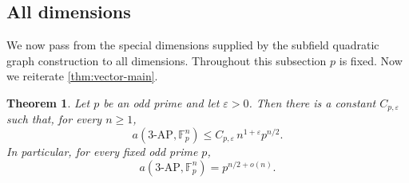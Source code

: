 \documentclass[11pt]{article}
\newtheorem{theorem}{Theorem}[section]
\begin{document}
	\subsection{All dimensions}\label{subsec:all-dimensions}
	
	We now pass from the special dimensions supplied by the subfield quadratic graph
	construction to all dimensions.   Throughout this subsection \(p\) is fixed. Now we reiterate  \cref{thm:vector-main}.
	
	\begin{theorem}
		Let \(p\) be an odd prime and let \(\varepsilon>0\).  Then there is a constant
		\(C_{p,\varepsilon}\) such that, for every \(n\ge1\),
		\[
		a(3\text{-}\mathrm{AP},\mathbb F_p^n)
		\le
		C_{p,\varepsilon}\,n^{1+\varepsilon}p^{n/2}.
		\]
		In particular, for every fixed odd prime \(p\),
		\[
		a(3\text{-}\mathrm{AP},\mathbb F_p^n)
		=
		p^{n/2+o(n)}.
		\]
	\end{theorem}
	
\end{document}
